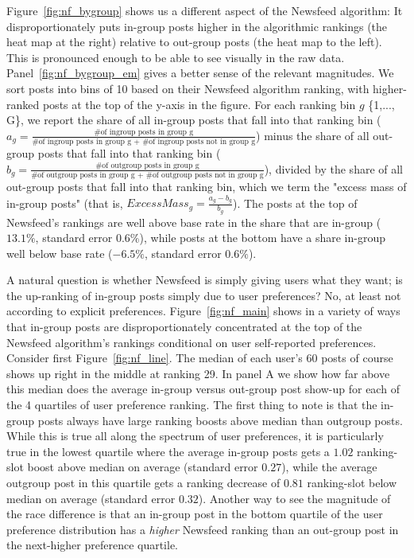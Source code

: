 \documentclass[12pt,letterpaper]{article}
\begin{document}
Figure~\ref{fig:nf_bygroup} shows us a different aspect of the Newsfeed algorithm: It disproportionately puts in-group posts higher in the algorithmic rankings (the heat map at the right) relative to out-group posts (the heat map to the left). This is pronounced enough to be able to see visually in the raw data. Panel~\ref{fig:nf_bygroup_em} gives a better sense of the relevant magnitudes. We sort posts into bins of 10 based on their Newsfeed algorithm ranking, with higher-ranked posts at the top of the y-axis in the figure. For each ranking bin $g$ \in \{1,..., G\}, we report the share of all in-group posts that fall into that ranking bin ($ a_g = \frac{\text{ \# of ingroup posts in group g }}{\text{\# of ingroup posts in group g + \# of ingroup posts not in group g}} $) minus the share of all out-group posts that fall into that ranking bin ($ b_g = \frac{\text{ \# of outgroup posts in group g }}{\text{\# of outgroup posts in group g + \# of outgroup posts not in group g}}$), divided by the share of all out-group posts that fall into that ranking bin, which we term the "excess mass of in-group posts" (that is, $ ExcessMass_g  = \frac{a_g -b_g}{b_g}$). The posts at the top of Newsfeed's rankings are well above base rate in the share that are in-group ($13.1\%$, standard error $0.6\%$), while posts at the bottom have a share in-group well below base rate ($-6.5\%$, standard error $0.6\%$).

A natural question is whether Newsfeed is simply giving users what they want; is the up-ranking of in-group posts simply due to user preferences? No, at least not according to explicit preferences. Figure~\ref{fig:nf_main} shows in a variety of ways that in-group posts are disproportionately concentrated at the top of the Newsfeed algorithm's rankings conditional on user self-reported preferences. Consider first Figure~\ref{fig:nf_line}. The median of each user's 60 posts of course shows up right in the middle at ranking 29. In panel A we show how far above this median does the average in-group versus out-group post show-up for each of the 4 quartiles of user preference ranking. The first thing to note is that the in-group posts always have large ranking boosts above median than outgroup posts. While this is true all along the spectrum of user preferences, it is particularly true in the lowest quartile where the average in-group posts gets a $1.02$ ranking-slot boost above median on average (standard error $0.27$), while the average outgroup post in this quartile gets a ranking decrease of $0.81$ ranking-slot below median on average (standard error $0.32$). Another way to see the magnitude of the race difference is that an in-group post in the bottom quartile of the user preference distribution has a \textit{higher} Newsfeed ranking than an out-group post in the next-higher preference quartile.
\end{document}

